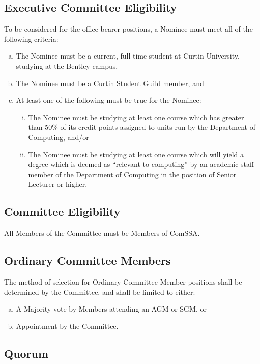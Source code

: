 \documentclass[a4paper,12pt]{article}
\begin{document}
\subsection{Executive Committee Eligibility}

To be considered for the office bearer positions, a Nominee must meet all of the following criteria:

\begin{enumerate}[a)]
	\item The Nominee must be a current, full time student at Curtin University, studying at the Bentley campus,
	\item The Nominee must be a Curtin Student Guild member, and
	\item At least one of the following must be true for the Nominee:
	\begin{enumerate}[i)]
		\item The Nominee must be studying at least one course which has greater than 50\% of its credit points assigned to units run by the Department of Computing, and/or
		\item The Nominee must be studying at least one course which will yield a degree which is deemed as ``relevant to computing'' by an academic staff member of the Department of Computing in the position of Senior Lecturer or higher.
	\end{enumerate}
\end{enumerate}

\subsection{Committee Eligibility}

All Members of the Committee must be Members of ComSSA.

\subsection{Ordinary Committee Members}

The method of selection for Ordinary Committee Member positions shall be determined by the Committee, and shall be limited to either:

\begin{enumerate}[a)]
	\item A Majority vote by Members attending an AGM or SGM, or
	\item Appointment by the Committee.
\end{enumerate}

\subsection{Quorum}
\end{document}
